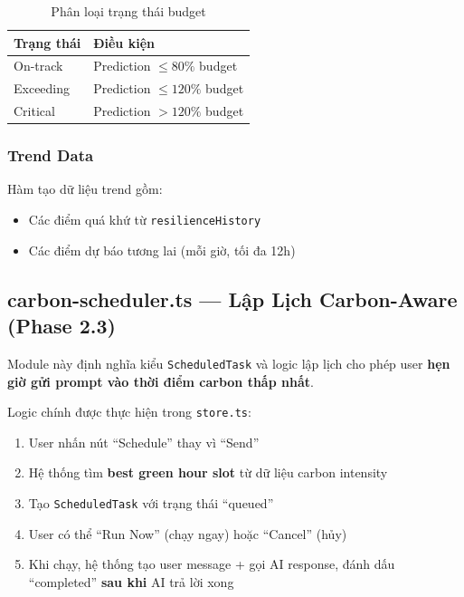 \documentclass[12pt,a4paper]{article}
\begin{document}
\begin{table}[h]
    \centering
    \begin{tabular}{ll}
        \toprule
        \textbf{Trạng thái} & \textbf{Điều kiện} \\
        \midrule
        On-track  & Prediction $\leq 80\%$ budget \\
        Exceeding & Prediction $\leq 120\%$ budget \\
        Critical  & Prediction $> 120\%$ budget \\
        \bottomrule
    \end{tabular}
    \caption{Phân loại trạng thái budget}
\end{table}

\subsubsection{Trend Data}

Hàm tạo dữ liệu trend gồm:
\begin{itemize}
    \item Các điểm quá khứ từ \texttt{resilienceHistory}
    \item Các điểm dự báo tương lai (mỗi giờ, tối đa 12h)
\end{itemize}

\subsection{carbon-scheduler.ts — Lập Lịch Carbon-Aware (Phase 2.3)}

Module này định nghĩa kiểu \texttt{ScheduledTask} và logic lập lịch cho phép user \textbf{hẹn giờ gửi prompt vào thời điểm carbon thấp nhất}.

Logic chính được thực hiện trong \texttt{store.ts}:

\begin{enumerate}
    \item User nhấn nút ``Schedule'' thay vì ``Send''
    \item Hệ thống tìm \textbf{best green hour slot} từ dữ liệu carbon intensity
    \item Tạo \texttt{ScheduledTask} với trạng thái ``queued''
    \item User có thể ``Run Now'' (chạy ngay) hoặc ``Cancel'' (hủy)
    \item Khi chạy, hệ thống tạo user message + gọi AI response, đánh dấu ``completed'' \textbf{sau khi} AI trả lời xong
\end{enumerate}
\end{document}
